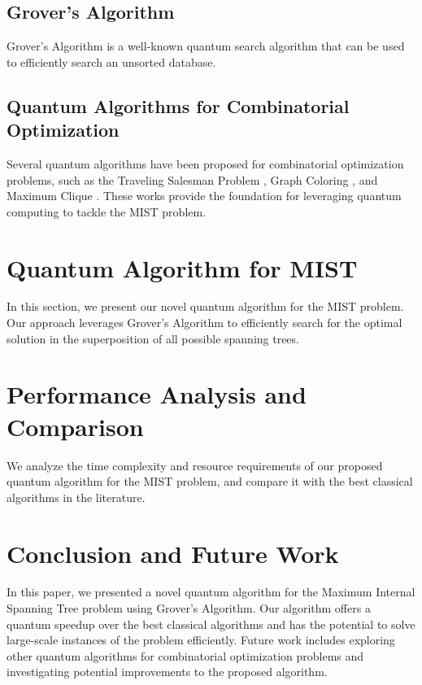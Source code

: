 \subsection{Grover's Algorithm}
Grover's Algorithm is a well-known quantum search algorithm that can be used to efficiently search an unsorted database.

\subsection{Quantum Algorithms for Combinatorial Optimization}
Several quantum algorithms have been proposed for combinatorial optimization problems, such as the Traveling Salesman Problem \cite{q_tsp}, Graph Coloring \cite{q_graph_coloring}, and Maximum Clique \cite{q_max_clique}. These works provide the foundation for leveraging quantum computing to tackle the MIST problem.

\section{Quantum Algorithm for MIST} \label{sec:algorithm}
In this section, we present our novel quantum algorithm for the MIST problem. Our approach leverages Grover's Algorithm to efficiently search for the optimal solution in the superposition of all possible spanning trees.

\section{Performance Analysis and Comparison} \label{sec:analysis}
We analyze the time complexity and resource requirements of our proposed quantum algorithm for the MIST problem, and compare it with the best classical algorithms in the literature.

\section{Conclusion and Future Work} \label{sec:conclusion}
In this paper, we presented a novel quantum algorithm for the Maximum Internal Spanning Tree problem using Grover's Algorithm. Our algorithm offers a quantum speedup over the best classical algorithms and has the potential to solve large-scale instances of the problem efficiently. Future work includes exploring other quantum algorithms for combinatorial optimization problems and investigating potential improvements to the proposed algorithm.





